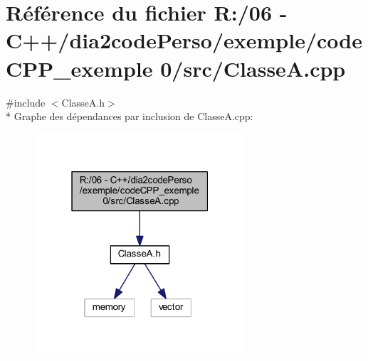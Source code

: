 \section{Référence du fichier R\+:/06 -\/ C++/dia2code\+Perso/exemple/code\+C\+P\+P\+\_\+exemple 0/src/\+Classe\+A.cpp}
\label{_classe_a_8cpp}
{\ttfamily \#include $<$Classe\+A.\+h$>$}\\*
Graphe des dépendances par inclusion de Classe\+A.\+cpp\+:\nopagebreak
\begin{figure}[H]
\begin{center}
\leavevmode
\includegraphics[width=223pt]{_classe_a_8cpp__incl}
\end{center}
\end{figure}
